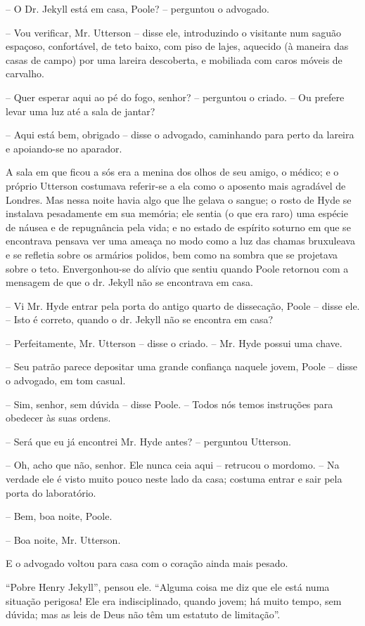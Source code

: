 -- O Dr. Jekyll está em casa, Poole? -- perguntou o advogado.

-- Vou verificar, Mr. Utterson -- disse ele, introduzindo o visitante
num saguão espaçoso, confortável, de teto baixo, com piso de lajes,
aquecido (à maneira das casas de campo) por uma lareira descoberta, e
mobiliada com caros móveis de carvalho.

-- Quer esperar aqui ao pé do fogo, senhor? -- perguntou o criado. -- Ou
prefere levar uma luz até a sala de jantar?

-- Aqui está bem, obrigado -- disse o advogado, caminhando para perto da
lareira e apoiando-se no aparador.

A sala em que ficou a sós era a menina dos olhos de seu amigo, o médico;
e o próprio Utterson costumava referir-se a ela como o aposento mais
agradável de Londres.  Mas nessa noite havia algo que lhe gelava o
sangue; o rosto de Hyde se instalava pesadamente em sua memória; ele
sentia (o que era raro) uma espécie de náusea e de repugnância pela
vida; e no estado de espírito soturno em que se encontrava pensava ver
uma ameaça no modo como a luz das chamas bruxuleava e se refletia sobre
os armários polidos, bem como na sombra que se projetava sobre o teto. 
Envergonhou-se do alívio que sentiu quando Poole retornou com a
mensagem de que o dr. Jekyll não se encontrava em casa.

-- Vi Mr. Hyde entrar pela porta do antigo quarto de dissecação, Poole
-- disse ele. -- Isto é correto, quando o dr. Jekyll não se encontra em
casa?

-- Perfeitamente, Mr. Utterson -- disse o criado. -- Mr. Hyde possui uma
chave.

-- Seu patrão parece depositar uma grande confiança naquele jovem,
Poole -- disse o advogado, em tom casual.

-- Sim, senhor, sem dúvida -- disse Poole. -- Todos nós temos instruções
para obedecer às suas ordens.

-- Será que eu já encontrei Mr. Hyde antes? -- perguntou Utterson.

-- Oh, acho que não, senhor.  Ele nunca ceia aqui -- retrucou o mordomo.
-- Na verdade ele é visto muito pouco neste lado da casa; costuma entrar
e sair pela porta do laboratório.

-- Bem, boa noite, Poole.

-- Boa noite, Mr. Utterson.

E o advogado voltou para casa com o coração ainda mais pesado.

“Pobre Henry Jekyll”, pensou ele.  “Alguma coisa me diz que ele está
numa situação perigosa!  Ele era indisciplinado, quando jovem; há muito
tempo, sem dúvida; mas as leis de Deus não têm um estatuto de
limitação”.  

